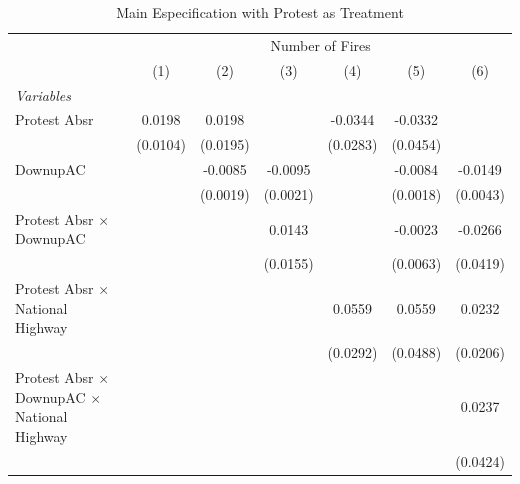 
\begin{table}[htbp]
   \caption{\label{tab:protest_treat_main} Main Especification with Protest as Treatment}
   \centering
   \begin{tabular}{lcccccc}
      \tabularnewline \midrule \midrule
       & \multicolumn{6}{c}{Number of Fires}\\
                                                                 & (1)           & (2)           & (3)           & (4)           & (5)           & (6)\\  
      \midrule
      \emph{Variables}\\
      Protest Absr                                               & 0.0198        & 0.0198        &               & -0.0344       & -0.0332       &   \\   
                                                                 & (0.0104)      & (0.0195)      &               & (0.0283)      & (0.0454)      &   \\   
      DownupAC                                                   &               & -0.0085       & -0.0095       &               & -0.0084       & -0.0149\\   
                                                                 &               & (0.0019)      & (0.0021)      &               & (0.0018)      & (0.0043)\\   
      Protest Absr $\times$ DownupAC                             &               &               & 0.0143        &               & -0.0023       & -0.0266\\   
                                                                 &               &               & (0.0155)      &               & (0.0063)      & (0.0419)\\   
      Protest Absr $\times$ National Highway                     &               &               &               & 0.0559        & 0.0559        & 0.0232\\   
                                                                 &               &               &               & (0.0292)      & (0.0488)      & (0.0206)\\   
      Protest Absr $\times$ DownupAC $\times$ National Highway   &               &               &               &               &               & 0.0237\\   
                                                                 &               &               &               &               &               & (0.0424)\\   

\end{tabular}
\end{table}
